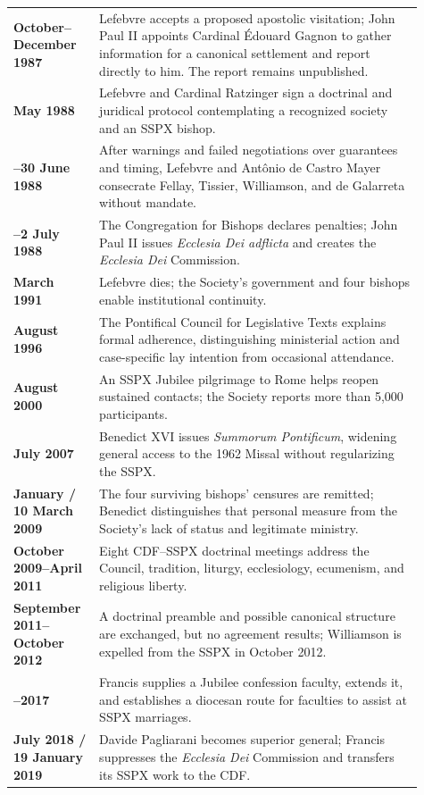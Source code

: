 \begin{longtable}{>{\bfseries\RaggedRight\arraybackslash}p{0.18\linewidth}>{\RaggedRight\arraybackslash}p{0.73\linewidth}}
18 October--December 1987 & Lefebvre accepts a proposed apostolic visitation; John Paul II appoints Cardinal Édouard Gagnon to gather information for a canonical settlement and report directly to him. The report remains unpublished.\\
5 May 1988 & Lefebvre and Cardinal Ratzinger sign a doctrinal and juridical protocol contemplating a recognized society and an SSPX bishop.\\
17--30 June 1988 & After warnings and failed negotiations over guarantees and timing, Lefebvre and Antônio de Castro Mayer consecrate Fellay, Tissier, Williamson, and de Galarreta without mandate.\\
1--2 July 1988 & The Congregation for Bishops declares penalties; John Paul II issues \emph{Ecclesia Dei adflicta} and creates the \emph{Ecclesia Dei} Commission.\\
25 March 1991 & Lefebvre dies; the Society's government and four bishops enable institutional continuity.\\
24 August 1996 & The Pontifical Council for Legislative Texts explains formal adherence, distinguishing ministerial action and case-specific lay intention from occasional attendance.\\
August 2000 & An SSPX Jubilee pilgrimage to Rome helps reopen sustained contacts; the Society reports more than 5,000 participants.\\
7 July 2007 & Benedict XVI issues \emph{Summorum Pontificum}, widening general access to the 1962 Missal without regularizing the SSPX.\\
21 January / 10 March 2009 & The four surviving bishops' censures are remitted; Benedict distinguishes that personal measure from the Society's lack of status and legitimate ministry.\\
October 2009--April 2011 & Eight CDF--SSPX doctrinal meetings address the Council, tradition, liturgy, ecclesiology, ecumenism, and religious liberty.\\
September 2011--October 2012 & A doctrinal preamble and possible canonical structure are exchanged, but no agreement results; Williamson is expelled from the SSPX in October 2012.\\
2015--2017 & Francis supplies a Jubilee confession faculty, extends it, and establishes a diocesan route for faculties to assist at SSPX marriages.\\
11 July 2018 / 19 January 2019 & Davide Pagliarani becomes superior general; Francis suppresses the \emph{Ecclesia Dei} Commission and transfers its SSPX work to the CDF.\\

\end{longtable}
